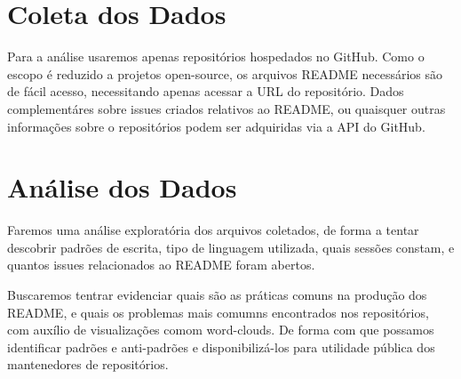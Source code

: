 \documentclass[preprint,12pt,authoryear]{elsarticle}
\begin{document}
\section{Coleta dos Dados}
Para a análise usaremos apenas repositórios hospedados no GitHub. Como o escopo é reduzido a projetos open-source, os arquivos README necessários são de fácil acesso, necessitando apenas acessar a URL do repositório. Dados complementáres sobre issues criados relativos ao README, ou quaisquer outras informações sobre o repositórios podem ser adquiridas via a API do GitHub.


\section{Análise dos Dados}
Faremos uma análise exploratória dos arquivos coletados, de forma a tentar descobrir padrões de escrita, tipo de linguagem utilizada, quais sessões constam, e quantos issues relacionados ao README foram abertos.

Buscaremos tentrar evidenciar quais são as práticas comuns na produção dos README, e quais os problemas mais comumns encontrados nos repositórios, com auxílio de visualizações comom word-clouds. De forma com que possamos identificar padrões e anti-padrões e disponibilizá-los para utilidade pública dos mantenedores de repositórios.



\begin{thebibliography}{00}


\bibitem[ ()]{}

\end{thebibliography}
\end{document}
